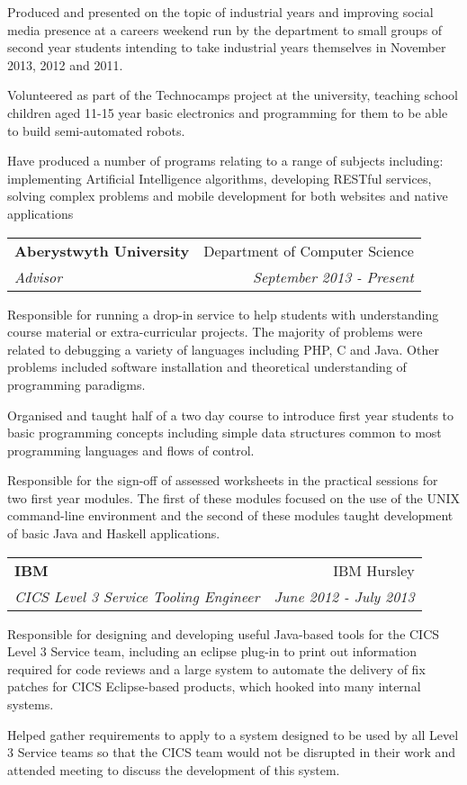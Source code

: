 \documentclass[letterpaper,11pt]{article}
\makeatletter
\newlength{\outerbordwidth}
\newcommand{\resheading}[1]{\vspace{8pt}
  \parbox{\textwidth}{\setlength{\FrameSep}{\outerbordwidth}
    \begin{shaded}
\setlength{\fboxsep}{0pt}\framebox[\textwidth][l]{\setlength{\fboxsep}{4pt}\fcolorbox{shadecolorB}{shadecolorB}{\textbf{\sffamily{\mbox{~}\makebox[6.762in][l]{\large #1} \vphantom{p\^{E}}}}}}
    \end{shaded}
  }\vspace{-5pt}
}
\newcommand{\ressubheading}[4]{
\vspace{10pt}
\begin{tabular*}{6.5in}{l@{\cftdotfill{\cftsecdotsep}\extracolsep{\fill}}r}
		\textbf{#1} & #2 \\
		\textit{#3} & \textit{#4} \\
\end{tabular*}\vspace{-6pt}
\vspace{10pt}}
\makeatother
\begin{document}
Produced and presented on the topic of industrial years and improving social
media presence at a careers weekend run by the department to small groups of
second year students intending to take industrial years themselves in November
2013, 2012 and 2011.

Volunteered as part of the Technocamps project at the university, teaching 
school children aged 11-15 year basic electronics and programming for them to 
be able to build semi-automated robots.

Have produced a number of programs relating to a range of subjects including: 
implementing Artificial Intelligence algorithms, developing RESTful services,
solving complex problems and mobile development for both websites and native 
applications


\resheading{Work Experience}

\ressubheading{Aberystwyth University}{Department of Computer Science}{Advisor}
{September 2013 - Present}

Responsible for running a drop-in service to help students with understanding
course material or extra-curricular projects. The majority of problems were
related to debugging a variety of languages including PHP, C and Java. Other
problems included software installation and theoretical understanding of 
programming paradigms.

Organised and taught half of a two day course to introduce first year students
to basic programming concepts including simple data structures common to most
programming languages and flows of control.

Responsible for the sign-off of assessed worksheets in the practical sessions
for two first year modules. The first of these modules
focused on the use of the UNIX command-line environment and the second of these
modules taught development of basic Java and Haskell applications.

\ressubheading{IBM}{IBM Hursley}{CICS Level 3 Service Tooling Engineer}
{June 2012 - July 2013}

Responsible for designing and developing useful Java-based tools for the CICS 
Level 3 Service team, including an eclipse plug-in to print out information 
required for code reviews and a large system to automate the delivery of fix 
patches for CICS Eclipse-based products, which hooked into many internal 
systems.

Helped gather requirements to apply to a system designed to be used by all 
Level 3 Service teams so that the CICS team would not be disrupted in their 
work and attended meeting to discuss the development of this system.
\end{document}
